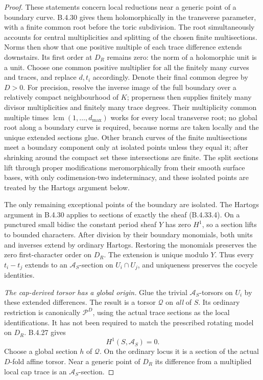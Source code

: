 \begin{proof}
These statements concern local reductions
near a generic point of a boundary curve.
B.4.30 gives them holomorphically in the
transverse parameter, with a finite
common root before the toric subdivision.
The root simultaneously accounts for
central multiplicities and splitting of
the chosen finite multisections. Norms
then show that one positive multiple of
each trace difference extends downstairs.
Its first order at $D_R$ remains zero:
the norm of a holomorphic unit is a unit.
Choose one common positive multiplier
for all the finitely many curves and
traces, and replace $d,t_i$ accordingly.
Denote their final common degree by $D>0$.
For precision, resolve the inverse image
of the full boundary over a relatively
compact neighbourhood of $K$; properness
then supplies finitely many divisor
multiplicities and finitely many trace
degrees. Their multiplicity common multiple
times $\operatorname{lcm}(1,\ldots,d_{\max})$
works for every local transverse root;
no global root along a boundary curve
is required, because norms are taken
locally and the unique extended sections
glue. Other branch curves of the finite
multisections meet a boundary component
only at isolated points unless they
equal it; after shrinking around the
compact set these intersections are
finite. The split sections lift through
proper modifications meromorphically from
their smooth surface bases, with only
codimension-two indeterminacy, and these
isolated points are treated by the
Hartogs argument below.

The only remaining exceptional points of
the boundary are isolated. The Hartogs
argument in B.4.30 applies to sections
of exactly the sheaf (B.4.33.4). On a
punctured small bidisc the constant
period sheaf $Y$ has zero $H^1$, so a
section lifts to bounded characters.
After division by their boundary monomials,
both units and inverses extend by ordinary
Hartogs. Restoring the monomials preserves
the zero first-character order on $D_R$.
The extension is unique modulo $Y$.
Thus every $t_i-t_j$ extends to an
$\mathcal A_S$-section on $U_i\cap U_j$,
and uniqueness preserves the cocycle
identities.

\emph{The cap-derived torsor has a global origin.}
Glue the trivial $\mathcal A_S$-torsors
on $U_i$ by these extended differences.
The result is a torsor $\mathcal Q$ on
\emph{all} of $S$. Its ordinary restriction
is canonically $\mathscr P^D$, using
the actual trace sections as the local
identifications. It has not been required
to match the prescribed rotating model
on $D_R$. B.4.27 gives
\[
 H^1(S,\mathcal A_S)=0.
 \tag{B.4.33.6}
\]
Choose a global section $h$ of $\mathcal Q$.
On the ordinary locus it is a section
of the actual $D$-fold affine torsor.
Near a generic point of $D_R$ its
difference from a multiplied local cap
trace is an $\mathcal A_S$-section.


\end{proof}
